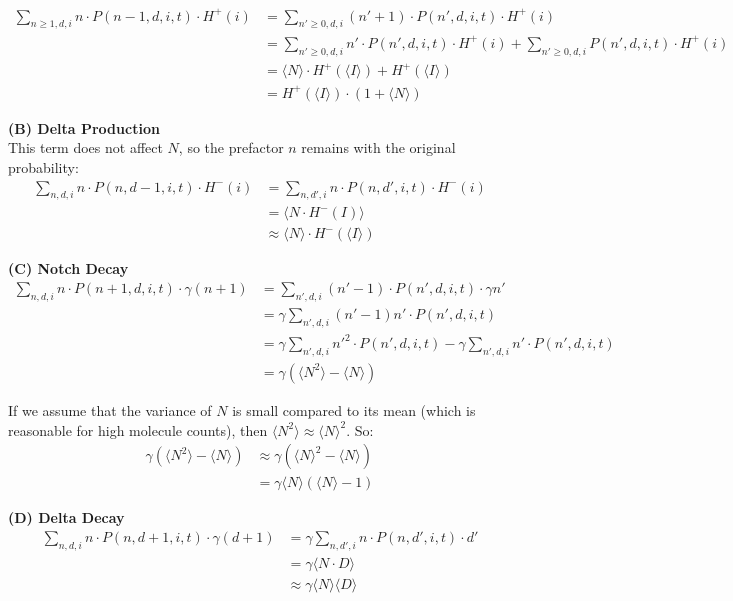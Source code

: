 \documentclass{article}
\begin{document}
\begin{flushleft}
\begin{small}
\begin{align*}
\sum_{n \geq 1,d,i} n \cdot P(n-1,d,i,t) \cdot H^+(i) &= \sum_{n' \geq 0,d,i} (n'+1) \cdot P(n',d,i,t) \cdot H^+(i) \\
&= \sum_{n' \geq 0,d,i} n' \cdot P(n',d,i,t) \cdot H^+(i) + \sum_{n' \geq 0,d,i} P(n',d,i,t) \cdot H^+(i) \\
&= \langle N \rangle \cdot H^+(\langle I \rangle) + H^+(\langle I \rangle) \\
&= H^+(\langle I \rangle) \cdot (1 + \langle N \rangle)
\end{align*}
\end{small}

\textbf{(B) Delta Production}\\
This term does not affect $N$, so the prefactor $n$ remains with the original probability:
\begin{align*}
\sum_{n,d,i} n \cdot P(n,d-1,i,t) \cdot H^-(i) &= \sum_{n,d',i} n \cdot P(n,d',i,t) \cdot H^-(i) \\
&= \langle N \cdot H^-(I) \rangle \\
&\approx \langle N \rangle \cdot H^-(\langle I \rangle)
\end{align*}

\textbf{(C) Notch Decay}
\begin{align*}
\sum_{n,d,i} n \cdot P(n+1,d,i,t) \cdot \gamma(n+1) &= \sum_{n',d,i} (n'-1) \cdot P(n',d,i,t) \cdot \gamma n' \\
&= \gamma \sum_{n',d,i} (n'-1)n' \cdot P(n',d,i,t) \\
&= \gamma \sum_{n',d,i} n'^2 \cdot P(n',d,i,t) - \gamma \sum_{n',d,i} n' \cdot P(n',d,i,t) \\
&= \gamma(\langle N^2 \rangle - \langle N \rangle)
\end{align*}

If we assume that the variance of $N$ is small compared to its mean (which is reasonable for high molecule counts), then $\langle N^2 \rangle \approx \langle N \rangle^2$. So:
\begin{align*}
\gamma(\langle N^2 \rangle - \langle N \rangle) &\approx \gamma(\langle N \rangle^2 - \langle N \rangle) \\
&= \gamma \langle N \rangle (\langle N \rangle - 1)
\end{align*}

\textbf{(D) Delta Decay}
\begin{align*}
\sum_{n,d,i} n \cdot P(n,d+1,i,t) \cdot \gamma(d+1) &= \gamma \sum_{n,d',i} n \cdot P(n,d',i,t) \cdot d' \\
&= \gamma \langle N \cdot D \rangle \\
&\approx \gamma \langle N \rangle \langle D \rangle
\end{align*}


\end{flushleft}
\end{document}

